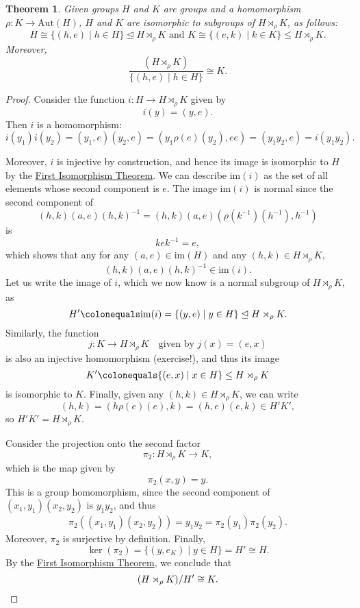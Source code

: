 \documentclass[12pt]{report}
\newtheorem{theorem}{Theorem}[chapter]
\numberwithin{equation}{section}
\numberwithin{theorem}{chapter}
\theoremstyle{definition}
\newtheorem*{basic properties}{Basic Properties}
\newtheorem*{Important Remark}{Important Remark}
\def\sdp{\rtimes}
\renewcommand{\ker}{\operatorname{ker}}
\begin{document}
\begin{theorem}\label{semidirect product}
Given groups $H$ and $K$ are groups and a homomorphism $\rho\!: K \to \mathrm{Aut}(H)$, $H$ and $K$ are isomorphic to subgroups of $H \sdp_\rho K$, as follows:
$$H \cong \{(h,e)\mid h\in H\} \trianglelefteq H \sdp_\rho K \text{ and } K \cong \{(e,k)\mid k\in K\} \leq H \sdp_\rho K.$$
Moreover,
$$\frac{(H \sdp_\rho K )}{\{(h,e)\mid h\in H\}} \cong K.$$
\end{theorem}

\begin{proof}
Consider the function $i\!: H \to H \sdp_\rho K$ given by 
$$i(y) = (y, e).$$
Then $i$ is a homomorphism:
$$i(y_1) i(y_2) = (y_1,e)(y_2,e) = (y_1\rho(e)(y_2) , ee) = (y_1 y_2, e) = i(y_1y_2).$$

Moreover, $i$ is injective by construction, and hence its image is isomorphic to $H$ by the \hyperref[first iso thm]{First Isomorphism Theorem}. We can describe $\mathrm{im}(i)$ as the set of all elements whose second component is $e$.
The image $\mathrm{im}(i)$ is normal since the second component of
$$(h,k) (a, e) (h,k)^{-1} = (h,k) (a, e) (\rho(k^{-1})(h^{-1}), h^{-1})$$
is
$$kek^{-1} = e,$$
which shows that any for any $(a,e) \in \mathrm{im}(H)$ and any $(h,k) \in H \sdp_\rho K$,
$$(h,k) (a, e) (h,k)^{-1} \in \mathrm{im}(i).$$
Let us write the image of $i$, which we now know is a normal subgroup of $H \sdp_\rho K$, as
$$H' \colonequals \mathrm{im}(i) = \{(y,e) \mid y \in H\} \trianglelefteq  H \sdp_\rho K.$$
Similarly, the function
$$j\!: K \to H \sdp_\rho K \quad \text{given by } j(x) = (e,x)$$
is also an injective homomorphism (exercise!), and thus its image 
$$K' \colonequals \{(e,x) \mid x \in H \} \leq H \sdp_\rho K$$
is isomorphic to $K$. 
Finally, given any $(h,k) \in H \sdp_{\rho} K$, we can write
$$ (h,k) = (h\rho(e)(e),k) = (h,e)(e,k) \in H'K',$$
so $H'K'= H \sdp_\rho K$.
%

Consider the projection onto the second factor 
$$\pi_2\!:H \sdp_\rho K \to  K,$$
which is the map given by 
$$\pi_2(x,y)=y.$$
This is a group homomorphism, since the second component of $(x_1,y_1)(x_2,y_2)$ is $y_1y_2$, and thus
$$\begin{aligned}
\pi_2(	(x_1,y_1)(x_2,y_2) ) = y_1y_2 = \pi_2(y_1) \pi_2(y_2).
\end{aligned}$$
Moreover, $\pi_2$ is surjective by definition. Finally, 
$$\ker(\pi_2)=\{(y,e_K)\mid y\in H\}=H'\cong H.$$
By the \hyperref[first iso thm]{First Isomorphism Theorem}, we conclude that 
$$(H \sdp_\rho K )/ H' \cong K.\qedhere$$
\end{proof}
\end{document}
